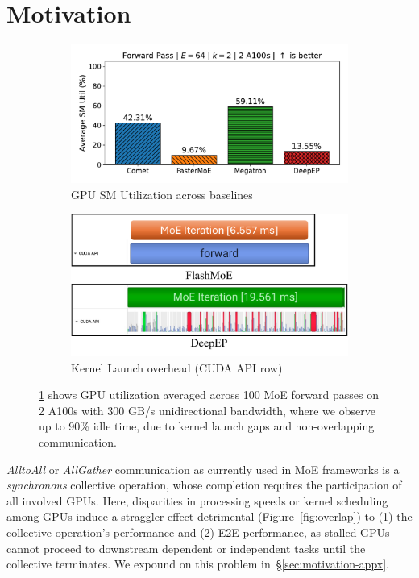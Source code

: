 \section{Motivation}\label{sec:motivation}
\begin{figure}[!h]
    \centering
    \begin{subfigure}{0.425\textwidth}
        \centering
        \includegraphics[width=\linewidth, keepaspectratio]{figures/sm_util_b}
        \caption{GPU SM Utilization across baselines}
        \label{sub:util}
    \end{subfigure}
    \begin{subfigure}{0.425\textwidth}
        \centering
        \includegraphics[width=\textwidth, keepaspectratio]{figures/kernel_launch}
        \caption{Kernel Launch overhead (CUDA API row)}
        \label{sub:launch}
    \end{subfigure}
    \caption{\ref{sub:util} shows GPU utilization averaged across 100 MoE forward passes on 2 A100s with
    300 GB/s unidirectional bandwidth, where we observe up to 90\% idle time, due to kernel launch gaps and
    non-overlapping communication.}
    \label{fig:kl}
\end{figure}
 \emph{AlltoAll} or \emph{AllGather} communication as currently used in MoE frameworks
is a \emph{synchronous} collective operation, whose completion requires the participation of all involved GPUs.
Here, disparities in processing speeds or kernel scheduling
among GPUs induce a straggler effect detrimental (Figure~\ref{fig:overlap}) to (1) the collective operation's performance and (2)
E2E performance, as stalled GPUs cannot proceed to downstream dependent or independent tasks until the collective terminates.
We expound on this problem in~\S\ref{sec:motivation-appx}.

